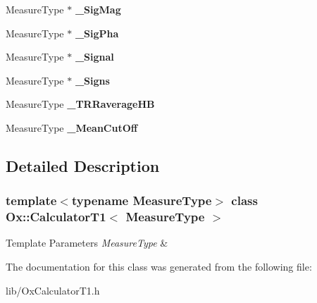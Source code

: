 \begin{DoxyCompactItemize}
\mbox{\label{class_ox_1_1_calculator_t1_a99008bd8540759a4ffc44baa619a2e90}} 
Measure\+Type $\ast$ {\bfseries \+\_\+\+Sig\+Mag}
\item 
\mbox{\label{class_ox_1_1_calculator_t1_a53ea1c14052b5616ec971587a0418af6}} 
Measure\+Type $\ast$ {\bfseries \+\_\+\+Sig\+Pha}
\item 
\mbox{\label{class_ox_1_1_calculator_t1_ae3a82567e3036dfa970c35e542ea0efc}} 
Measure\+Type $\ast$ {\bfseries \+\_\+\+Signal}
\item 
\mbox{\label{class_ox_1_1_calculator_t1_ae770bf1df65f217e264bc680e4376d09}} 
Measure\+Type $\ast$ {\bfseries \+\_\+\+Signs}
\item 
\mbox{\label{class_ox_1_1_calculator_t1_ad60ecfeaac3213049f347bcc6c47292f}} 
Measure\+Type {\bfseries \+\_\+\+T\+R\+Raverage\+HB}
\item 
\mbox{\label{class_ox_1_1_calculator_t1_a091c2674b79e1c0374637eff90e2becb}} 
Measure\+Type {\bfseries \+\_\+\+Mean\+Cut\+Off}
\end{DoxyCompactItemize}


\subsection{Detailed Description}
\subsubsection*{template$<$typename Measure\+Type$>$\newline
class Ox\+::\+Calculator\+T1$<$ Measure\+Type $>$}


\begin{DoxyTemplParams}{Template Parameters}
{\em Measure\+Type} & \\
\hline
\end{DoxyTemplParams}


The documentation for this class was generated from the following file\+:\begin{DoxyCompactItemize}
\item 
lib/Ox\+Calculator\+T1.\+h\end{DoxyCompactItemize}
